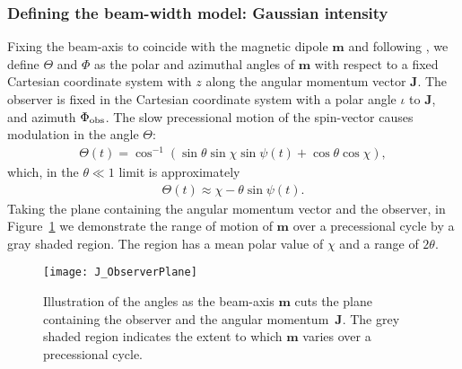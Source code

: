 \documentclass[../full_thesis/full_thesis.tex]{subfiles}
\begin{document}
\subsubsection{Defining the beam-width model: Gaussian intensity}


Fixing the beam-axis to coincide with the magnetic dipole $\mathbf{m}$ and
following \citet{Jones2001}, we define $\Theta$ and $\Phi$ as the polar and
azimuthal angles of $\mathbf{m}$ with respect to a fixed Cartesian coordinate
system with $z$ along the angular momentum vector $\textbf{J}$. The observer is
fixed in the Cartesian coordinate system with a polar angle $\iota$ to $\textbf{J}$, and
azimuth $\Phi_{\mathrm{obs}}$. The slow precessional motion of the spin-vector causes modulation
in the angle $\Theta$:
\begin{align}
\Theta(t) = \cos^{-1}\left(\sin\theta\sin\chi\sin\psi(t) + \cos\theta\cos\chi\right),
\label{eqn: Theta}
\end{align}
which, in the $\theta \ll 1$ limit is approximately
\begin{align}
\Theta(t) \approx \chi - \theta \sin\psi(t).
\end{align}
Taking the plane containing the angular momentum vector and the observer, in
Figure~\ref{fig: J observer plane} we demonstrate the range of motion of
$\mathbf{m}$ over a precessional cycle by a gray shaded region.  The region has
a mean polar value of $\chi$ and a range of $2\theta$.
\begin{figure}
\centering \texttt{[image: J\_ObserverPlane]}
\caption{Illustration of the angles as the beam-axis $\mathbf{m}$ cuts the
         plane containing the observer and the angular momentum~$\mathbf{J}$.
         The grey shaded region indicates the extent to which $\mathbf{m}$
         varies over a precessional cycle.}
\label{fig: J observer plane}
\end{figure}
\end{document}
